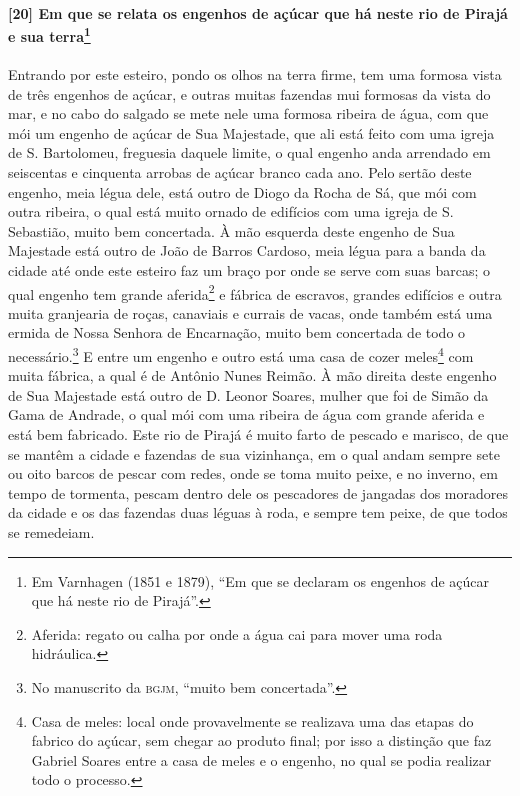 \begin{linenumbers}
\paragraph{[20] Em que se relata os engenhos de açúcar que há neste rio de Pirajá e sua
terra\protect\footnote{ Em Varnhagen (1851 e 1879), ``Em que se declaram os engenhos de
açúcar que há neste rio de Pirajá''.}}\quad
Entrando por este esteiro, pondo os olhos na terra firme, tem uma formosa vista de três
engenhos de açúcar, e outras muitas fazendas mui formosas da vista do mar, e no cabo do
salgado se mete nele uma formosa ribeira de água, com que mói um engenho de açúcar de Sua
Majestade, que ali está feito com uma igreja de S. Bartolomeu, freguesia daquele limite, o
qual engenho anda arrendado em seiscentas e cinquenta arrobas de açúcar branco cada ano.
Pelo sertão deste engenho, meia légua dele, está outro de Diogo da Rocha de Sá, que mói
com outra ribeira, o qual está muito ornado de edifícios com uma igreja de S. Sebastião,
muito bem concertada. À mão esquerda deste engenho de Sua Majestade está outro de João de
Barros Cardoso, meia légua para a banda da cidade até onde este esteiro faz um braço por
onde se serve com suas barcas; o qual engenho tem grande aferida\footnote{ Aferida: regato
ou calha por onde a água cai para mover uma roda hidráulica.} e fábrica de escravos,
grandes edifícios e outra muita granjearia de roças, canaviais e currais de vacas, onde
também está uma ermida de Nossa Senhora de Encarnação, muito bem concertada de todo o
necessário.\footnote{ No manuscrito da \textsc{bgjm}, ``muito bem concertada''.} E entre
um engenho e outro está uma casa de cozer meles\footnote{ Casa de meles: local onde
provavelmente se realizava uma das etapas do fabrico do açúcar, sem chegar ao produto
final; por isso a distinção que faz Gabriel Soares entre a casa de meles e o engenho, no
qual se podia realizar todo o processo.} com muita fábrica, a qual é de Antônio Nunes
Reimão. À mão direita deste engenho de Sua Majestade está outro de D. Leonor Soares,
mulher que foi de Simão da Gama de Andrade, o qual mói com uma ribeira de água com grande
aferida e está bem fabricado. Este rio de Pirajá é muito farto de pescado e marisco, de
que se mantêm a cidade e fazendas de sua vizinhança, em o qual andam sempre sete ou oito
barcos de pescar com redes, onde se toma muito peixe, e no inverno, em tempo de tormenta,
pescam dentro dele os pescadores de jangadas dos moradores da cidade e os das fazendas
duas léguas à roda, e sempre tem peixe, de que todos se remedeiam.


\end{linenumbers}
